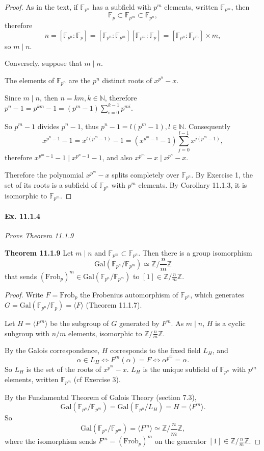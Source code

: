 \documentclass[11pt,a4paper]{article}
\newcommand{\Z}{\mathbb{Z}}
\newcommand{\N}{\mathbb{N}}
\newcommand{\F}{\mathbb{F}}
\newcommand{\Gal}{\mathrm{Gal}}
\begin{document}
\begin{proof} 
As in the text, if $\F_{p^n}$ has a subfield with $p^m$ elements, written $\F_{p^m}$, then
$$\F_p \subset \F_{p^m} \subset \F_{p^n},$$
therefore
$$n = [\F_{p^n} : \F_p] = [\F_{p^n} : \F_{p^m}]  [\F_{p^m} : \F_{p}] =  [\F_{p^n} : \F_{p^m}] \times m,$$
so $m \mid n$.

Conversely, suppose that $m \mid n$.

The elements of $\F_{p^n}$ are the $p^n$ distinct roots of $x^{p^n} - x$.

Since $m\mid n$, then $n = k m, k \in \N$, therefore $p^n - 1 = p^{km} - 1 = (p^m-1)\sum\limits_{i=0}^{k-1} p^{mi}$.

So $p^m-1$ divides $p^n - 1$, thus $p^n-1 = l (p^m-1), l \in \N$. Consequently
$$x^{p^n-1} - 1 = x^{l(p^m-1)}- 1 = (x^{p^m-1} - 1)\sum_{j=0}^{l-1} x^{j(p^m-1)},$$
therefore $ x^{p^m-1} - 1 \mid x^{p^n-1} - 1$, and also $x^{p^m} - x \mid x^{p^n}- x$.

Therefore the polynomial $x^{p^m} -x$ splits completely over $\F_{p^n}$. By Exercise 1, the set of its roots is a subfield of $\F_{p^n}$ with $p^m$ elements. By Corollary 11.1.3, it is isomorphic to $\F_{p^m}$.
\end{proof}

\paragraph{Ex. 11.1.4}

{\it Prove Theorem 11.1.9

\medskip

{\bf Theorem 11.1.9} Let $m\mid n$ and $\F_{p^m} \subset \F_{p^n}$. Then there is a group isomorphism 
$$\Gal(\F_{p^n}/\F_{p^m}) \simeq \Z / {\frac{n}{m}} \Z$$
that sends $(\mathrm{Frob}_p)^m \in \Gal(\F_{p^n}/\F_{p^m})$ to $[1] \in \Z/\frac{n}{m}\Z$.
}

\begin{proof}
Write $F = \mathrm{Frob}_p$ the Frobenius automorphism of $\F_{p^n}$, which generates $G = \Gal(\F_{p^n}/\F_p) = \langle F \rangle$ (Theorem 11.1.7). 

Let $H = \langle F^m \rangle$ be the subgroup of $G$ generated by $F^m$. As $m \mid n$, $H$ is a cyclic subgroup with $n/m$ elements, isomorphic to $\Z/\frac{n}{m}\Z$.

By the Galois correspondence, $H$ corresponds to the fixed field $L_H$, and $$\alpha \in L_H \iff F^m(\alpha) = F \iff \alpha^{p^m} = \alpha.$$ 
So $L_H$ is the set of the roots of $x^{p^m} - x$. $L_H$ is the unique subfield of  $\F_{p^n}$ with $p^m$ elements, written $\F_{p^m}$ (cf Exercise 3).

By the Fundamental Theorem of Galois Theory (section 7.3), 
$$\Gal(\F_{p^n}/\F_{p^m}) = \Gal(\F_{p^n}/L_H) = H = \langle F^m \rangle.$$
So $$\Gal(\F_{p^n}/\F_{p^m}) =\langle F^m \rangle \simeq \Z/\frac{n}{m}\Z,$$
 where the isomorphism sends $F^m = (\mathrm{Frob}_p)^m$ on the generator $[1]\in \Z/\frac{n}{m}\Z$.
\end{proof}
\end{document}
